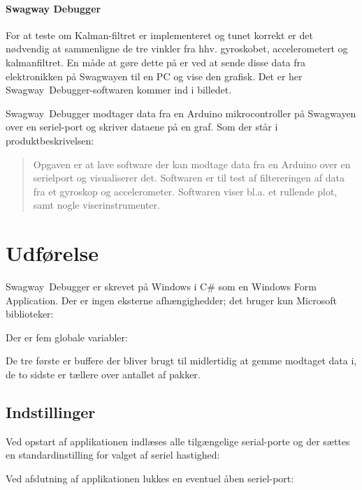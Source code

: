 \documentclass[a4paper,oneside,article,danish,table]{memoir}
\newcommand{\form}[2]{}
\begin{document}
\subsubsection{Swagway Debugger}
For at teste om Kalman-filtret er implementeret og tunet korrekt er det nødvendig at sammenligne de tre vinkler fra hhv. gyroskobet, accelerometert og kalmanfiltret. En måde at gøre dette på er ved at sende disse data fra elektronikken på Swagwayen til en PC og vise den grafisk. Det er her Swagway~Debugger-softwaren kommer ind i billedet.

Swagway~Debugger modtager data fra en Arduino mikrocontroller på Swagwayen over en seriel-port og skriver dataene på en graf. Som der står i produktbeskrivelsen:
\begin{quotation}
  Opgaven er at lave software der kan modtage data fra en Arduino over en serielport og visualiserer det. Softwaren er til test af filtereringen af data fra et gyroskop og accelerometer. Softwaren viser bl.a. et rullende plot, samt nogle viserinstrumenter.
\end{quotation}

\chapter{Udførelse}
Swagway~Debugger er skrevet på Windows i C\# som en Windows Form Application. Der er ingen eksterne afhængighedder; det bruger kun Microsoft biblioteker: 
\form{9}{12}
Der er fem globale variabler:
\form{18}{23}
De tre første er buffere der bliver brugt til midlertidig at gemme modtaget data i, de to sidste er tællere over antallet af pakker.

\section{Indstillinger}
Ved opstart af applikationen indlæses alle tilgængelige serial-porte og der sættes en standardinstilling for valget af seriel hastighed:
\form{34}{39}
Ved afslutning af applikationen lukkes en eventuel åben seriel-port:
\form{41}{48}

%
\end{document}
